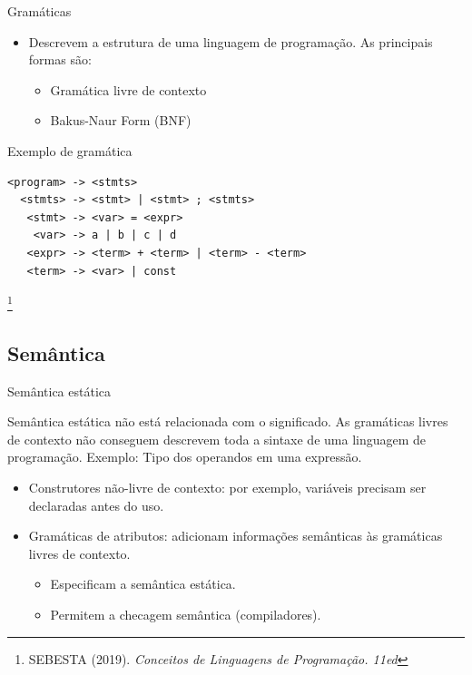 \documentclass[handout, aspectratio=169]{beamer}
\begin{document}
\begin{frame}[fragile]{Gramáticas}
	\begin{itemize}
		\item Descrevem a estrutura de uma linguagem de programação. As principais formas são:
		\begin{itemize}
			\item Gramática livre de contexto
			\item Bakus-Naur Form (BNF)
		\end{itemize}
	\end{itemize}

	\begin{block}{Exemplo de gramática}
		\begin{verbatim}
<program> -> <stmts>
  <stmts> -> <stmt> | <stmt> ; <stmts>
   <stmt> -> <var> = <expr>
    <var> -> a | b | c | d
   <expr> -> <term> + <term> | <term> - <term>
   <term> -> <var> | const
		\end{verbatim}\footnote{SEBESTA (2019). \textit{Conceitos de Linguagens de Programação. 11ed}}
	\end{block}
\end{frame}

\subsection{Semântica}

\begin{frame}{Semântica estática}
	\begin{block}{Semântica estática}
		não está relacionada com o significado. As gramáticas livres de contexto não conseguem descrevem toda a sintaxe de uma linguagem de programação. Exemplo: Tipo dos operandos em uma expressão.
	\end{block}

	\begin{itemize}
		\item Construtores não-livre de contexto: por exemplo, variáveis precisam ser declaradas antes do uso.
		\item Gramáticas de atributos: adicionam informações semânticas às gramáticas livres de contexto.
		\begin{itemize}
			\item Especificam a semântica estática.
			\item Permitem a checagem semântica (compiladores).
		\end{itemize}
	\end{itemize}
\end{frame}
\end{document}
